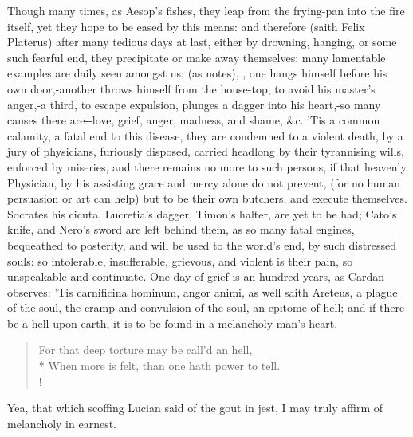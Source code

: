 Though many times, as Aesop's fishes, they leap from the frying-pan
into the fire itself, yet they hope to be eased by this means: and
therefore (saith Felix Platerus) after many tedious days at last,
either by drowning, hanging, or some such fearful end, they precipitate
or make away themselves: many lamentable examples are daily seen
amongst us:  (as \Seneca{} notes),
, one hangs himself
before his own door,-another throws himself from the house-top, to
avoid his master's anger,-a third, to escape expulsion, plunges a
dagger into his heart,-so many causes there are--love, grief, anger, madness, and shame, \&c. 'Tis a common
calamity, a fatal end to this disease, they are condemned to a
violent death, by a jury of physicians, furiously disposed, carried
headlong by their tyrannising wills, enforced by miseries, and there
remains no more to such persons, if that heavenly Physician, by his
assisting grace and mercy alone do not prevent, (for no human
persuasion or art can help) but to be their own butchers, and execute
themselves. Socrates his cicuta, Lucretia's dagger, Timon's halter, are
yet to be had; Cato's knife, and Nero's sword are left behind them, as
so many fatal engines, bequeathed to posterity, and will be used to the
world's end, by such distressed souls: so intolerable, insufferable,
grievous, and violent is their pain, so unspeakable and
continuate. One day of grief is an hundred years, as Cardan observes:
'Tis carnificina hominum, angor animi, as well saith Areteus, a plague
of the soul, the cramp and convulsion of the soul, an epitome of hell;
and if there be a hell upon earth, it is to be found in a melancholy
man's heart.

\begin{verse}%
For that deep torture may be call'd an hell,\\*
When more is felt, than one hath power to tell.\\!
\end{verse}%

Yea, that which scoffing Lucian said of the gout in jest, I may truly
affirm of melancholy in earnest.

